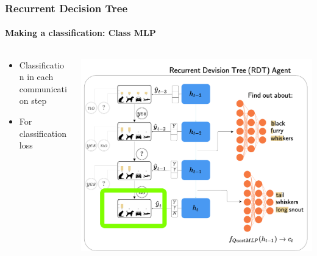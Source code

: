 \documentclass[9pt]{beamer}
\begin{document}
\begin{frame}
\frametitle{Recurrent Decision Tree}
\framesubtitle{Making a classification: Class MLP}
\begin{columns}[T]
\begin{column}{.5\textwidth}
\begin{itemize}
	\item Classification in each communication step
	\item For classification loss
\end{itemize}
\end{column}
\begin{column}{.5\textwidth}
\includegraphics[width=\textwidth]{images/urdtc_parts_classMLP.pdf}
\end{column}
\end{columns}
\end{frame}
\end{document}
